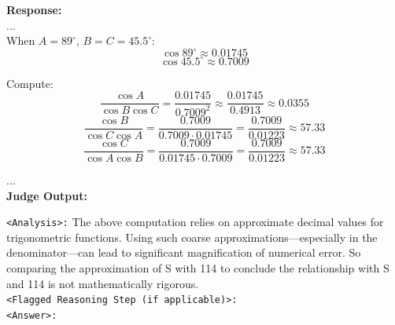 \begin{examplebox}
\textbf{Response:}\\
...\\
When \(A = 89^\circ\), \(B = C = 45.5^\circ\):\\
\[
\cos 89^\circ \approx 0.01745
\]
\[
\cos 45.5^\circ \approx 0.7009
\]

Compute:
\[
\frac{\cos A}{\cos B \cos C} = \frac{0.01745}{0.7009^2} \approx \frac{0.01745}{0.4913} \approx 0.0355
\]
\[
\frac{\cos B}{\cos C \cos A} = \frac{0.7009}{0.7009 \cdot 0.01745} = \frac{0.7009}{0.01223} \approx 57.33
\]
\[
\frac{\cos C}{\cos A \cos B} = \frac{0.7009}{0.01745 \cdot 0.7009} = \frac{0.7009}{0.01223} \approx 57.33
\]



...\\

\textbf{Judge Output:}

\texttt{<Analysis>:} The above computation relies on approximate decimal values for trigonometric functions. Using such coarse approximations—especially in the denominator—can lead to significant magnification of numerical error. So comparing the approximation of S with 114 to conclude the relationship with S and 114 is not mathematically rigorous. \\

\texttt{<Flagged Reasoning Step (if applicable)>:} \\

\texttt{<Answer>:} \textbf{}

\end{examplebox}